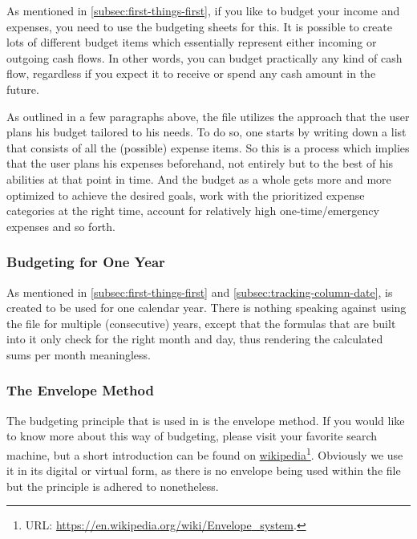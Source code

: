 As mentioned in \autoref{subsec:first-things-first}, if you like to budget your income and expenses, you need to use the budgeting sheets for this.
It is possible to create lots of different budget items which essentially represent either incoming or outgoing cash flows.
In other words, you can budget practically any kind of cash flow, regardless if you expect it to receive or spend any cash amount in the future.

As outlined in a few paragraphs above, the file utilizes the approach that the user plans his budget tailored to his needs.
To do so, one starts by writing down a list that consists of all the (possible) expense items.
So this is a process which implies that the user plans his expenses beforehand, not entirely but to the best of his abilities at that point in time.
And the budget as a whole gets more and more optimized to achieve the desired goals, work with the prioritized expense categories at the right time, account for relatively high one-time/emergency expenses and so forth.

\subsubsection{Budgeting for One Year}
\label{subsubsec:budgeting-for-one-year}

As mentioned in \autoref{subsec:first-things-first} and \autoref{subsec:tracking-column-date}, \tfn is created to be used for one calendar year.
There is nothing speaking against using the file for multiple (consecutive) years, except that the formulas that are built into it only check for the right month and day, thus rendering the calculated sums per month meaningless.

\subsubsection{The Envelope Method}
\label{subsubsec:budgeting-the-envelope-method}

The budgeting principle that is used in \tfn is the envelope method.
If you would like to know more about this way of budgeting, please visit your favorite search machine, but a short introduction can be found on \href{https://en.wikipedia.org/wiki/Envelope_system}{wikipedia}\footnote{URL: \href{https://en.wikipedia.org/wiki/Envelope_system}{https://en.wikipedia.org/wiki/Envelope{\_}system}.}.
Obviously we use it in its digital or virtual form, as there is no envelope being used within the file but the principle is adhered to nonetheless.

